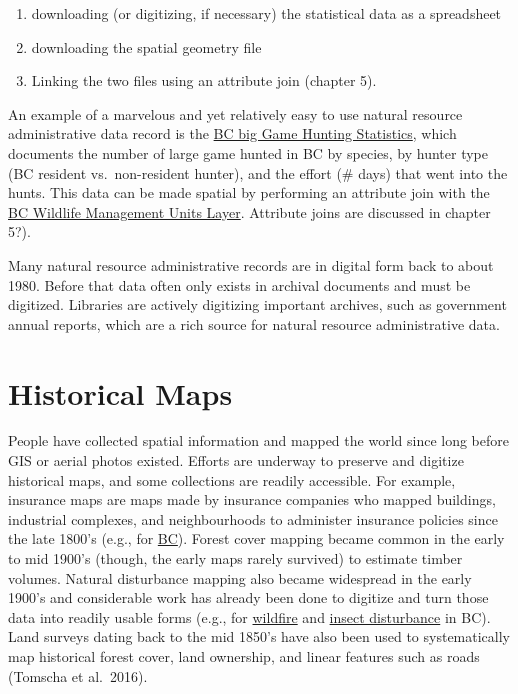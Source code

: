 \documentclass[
]{book}
\providecommand{\tightlist}{%
  \setlength{\itemsep}{0pt}\setlength{\parskip}{0pt}}
\begin{document}
\begin{enumerate}
\def\labelenumi{\arabic{enumi}.}
\tightlist
\item
  downloading (or digitizing, if necessary) the statistical data as a spreadsheet
\item
  downloading the spatial geometry file
\item
  Linking the two files using an attribute join (chapter 5).
\end{enumerate}

An example of a marvelous and yet relatively easy to use natural resource administrative data record is the \href{https://catalogue.data.gov.bc.ca/dataset/big-game-harvest-statistics-1976-to-current}{BC big Game Hunting Statistics}, which documents the number of large game hunted in BC by species, by hunter type (BC resident vs.~non-resident hunter), and the effort (\# days) that went into the hunts. This data can be made spatial by performing an attribute join with the \href{https://catalogue.data.gov.bc.ca/dataset/wildlife-management-units}{BC Wildlife Management Units Layer}. Attribute joins are discussed in chapter 5?).

Many natural resource administrative records are in digital form back to about 1980. Before that data often only exists in archival documents and must be digitized. Libraries are actively digitizing important archives, such as government annual reports, which are a rich source for natural resource administrative data.

\hypertarget{historical-maps}{%
\section{Historical Maps}\label{historical-maps}}

People have collected spatial information and mapped the world since long before GIS or aerial photos existed. Efforts are underway to preserve and digitize historical maps, and some collections are readily accessible. For example, insurance maps are maps made by insurance companies who mapped buildings, industrial complexes, and neighbourhoods to administer insurance policies since the late 1800's (e.g., for \href{https://guides.library.ubc.ca/c.php?g=699984\&p=4977440}{BC}). Forest cover mapping became common in the early to mid 1900's (though, the early maps rarely survived) to estimate timber volumes. Natural disturbance mapping also became widespread in the early 1900's and considerable work has already been done to digitize and turn those data into readily usable forms (e.g., for \href{https://catalogue.data.gov.bc.ca/dataset/fire-perimeters-historical}{wildfire} and \href{https://catalogue.data.gov.bc.ca/dataset/pest-infestation-polygons-historic}{insect disturbance} in BC). Land surveys dating back to the mid 1850's have also been used to systematically map historical forest cover, land ownership, and linear features such as roads (Tomscha et al.~2016).
\end{document}
